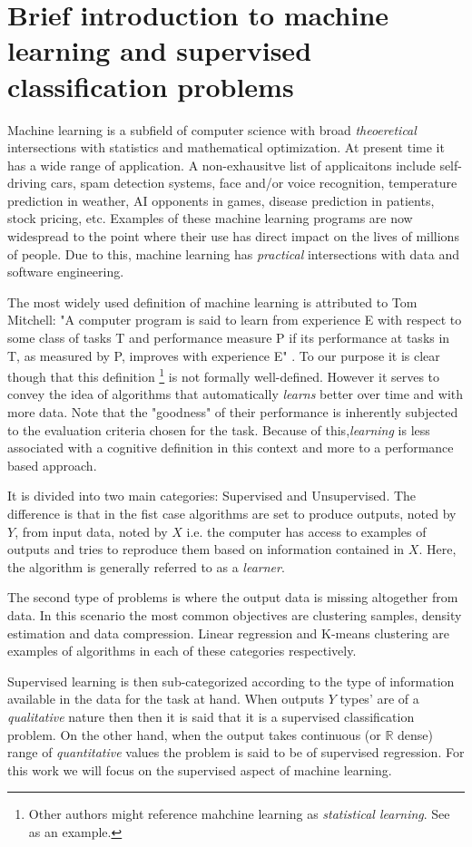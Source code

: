 
\section{ Brief introduction to machine learning and supervised classification problems}

Machine learning is a subfield of computer science with broad \textit{theoeretical} intersections with statistics and mathematical optimization. At present time it has a wide range of application. A non-exhausitve list of applicaitons include self-driving cars, spam detection systems, face and/or voice recognition, temperature prediction in weather, AI opponents in games, disease prediction in patients, stock pricing, etc. Examples of these machine learning programs are now widespread to the point where their use has direct impact on the lives of millions of people. Due to this, machine learning has \textit{practical} intersections with data and software engineering.

The most widely used definition of machine learning is attributed to Tom Mitchell: 	 
"A computer program is said to learn from experience E with respect to some class of tasks T and performance measure P if its performance at tasks in T, as measured by P, improves with experience E" \cite{Mitchell-MLearning}. To our purpose it is clear though that this definition \footnote{Other authors might reference mahchine learning as \textit{statistical learning}. See \cite{hastie-elemstatslearn} as an example.} is not formally well-defined. However it serves to convey the idea of algorithms that automatically \textit{learns} better over time and with more data. Note that the "goodness" of their performance is inherently subjected to the evaluation criteria chosen for the task. Because of this,\textit{learning} is less associated with a cognitive definition in this context and more to a performance based approach.


It is divided into two main categories: Supervised and Unsupervised. The difference is that in the fist case algorithms are set to produce outputs, noted by $Y$, from input data, noted by $X$ i.e. the computer has access to examples of outputs and tries to reproduce them based on information contained in $X$. Here, the algorithm is generally referred to as a \textit{learner}.

The second type of problems is where the output data is missing altogether from data. In this scenario the most common objectives are clustering samples, density estimation and data compression. Linear regression and K-means clustering are examples of algorithms in each of these categories respectively.

Supervised learning is then sub-categorized according to the type of information available in the data for the task at hand. When outputs $Y$ types' are of a \textit{qualitative} nature then then it is said that it is a supervised classification problem. On the other hand, when the output takes continuous (or $\mathbb{R}$ dense) range of \textit{quantitative} values the problem is said to be of supervised regression. For this work we will focus on the supervised aspect of machine learning.